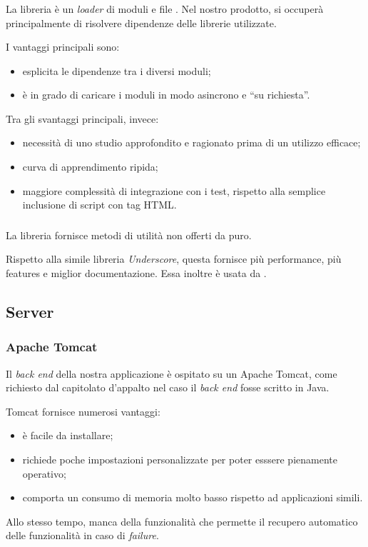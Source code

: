 \subsubsection{\requirejs}
La libreria \requirejs{} è un \emph{loader} di moduli e file \js. Nel nostro prodotto, si occuperà principalmente di risolvere dipendenze delle librerie \js{} utilizzate.

I vantaggi principali sono:
\begin{itemize}
	\item esplicita le dipendenze tra i diversi moduli;
	\item \`e in grado di caricare i moduli in modo asincrono e ``su richiesta''.
\end{itemize}
Tra gli svantaggi principali, invece:
\begin{itemize}
	\item necessità di uno studio approfondito e ragionato prima di un utilizzo efficace;
	\item curva di apprendimento ripida;
	\item maggiore complessità di integrazione con i test, rispetto alla semplice inclusione di script con tag HTML. 
\end{itemize} 


\subsubsection{\lodash}
La libreria \lodash{} fornisce metodi di utilità non offerti da \js{} puro. 

Rispetto alla simile libreria \emph{Underscore}, questa fornisce più performance, più features e miglior documentazione. Essa inoltre è usata da \jointjs.



\subsection{Server}

\subsubsection{Apache Tomcat}
Il \emph{back end} della nostra applicazione è ospitato su un  Apache Tomcat, come richiesto dal capitolato d'appalto nel caso il \emph{back end} fosse scritto in Java.

Tomcat fornisce numerosi vantaggi:
\begin{itemize}
	\item \`e facile da installare;
	\item richiede poche impostazioni personalizzate per poter esssere pienamente operativo;
	\item comporta un consumo di memoria molto basso rispetto ad applicazioni simili.
\end{itemize}
Allo stesso tempo, manca della funzionalità che permette il recupero automatico delle funzionalità in caso di \emph{failure}.



